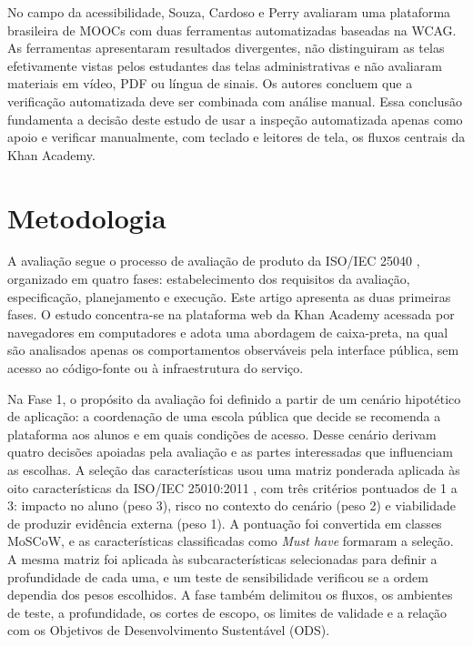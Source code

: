 \documentclass[sigconf, language=english, language=brazilian,natbib=false]{acmart}
\begin{document}
No campo da acessibilidade, Souza, Cardoso e Perry \cite{souza2019limitacoes} avaliaram uma plataforma brasileira de MOOCs com duas ferramentas automatizadas baseadas na WCAG. As ferramentas apresentaram resultados divergentes, não distinguiram as telas efetivamente vistas pelos estudantes das telas administrativas e não avaliaram materiais em vídeo, PDF ou língua de sinais. Os autores concluem que a verificação automatizada deve ser combinada com análise manual. Essa conclusão fundamenta a decisão deste estudo de usar a inspeção automatizada apenas como apoio e verificar manualmente, com teclado e leitores de tela, os fluxos centrais da Khan Academy.

\section{Metodologia}

A avaliação segue o processo de avaliação de produto da ISO/IEC 25040 \cite{iso25040}, organizado em quatro fases: estabelecimento dos requisitos da avaliação, especificação, planejamento e execução. Este artigo apresenta as duas primeiras fases. O estudo concentra-se na plataforma web da Khan Academy acessada por navegadores em computadores e adota uma abordagem de caixa-preta, na qual são analisados apenas os comportamentos observáveis pela interface pública, sem acesso ao código-fonte ou à infraestrutura do serviço.

Na Fase 1, o propósito da avaliação foi definido a partir de um cenário hipotético de aplicação: a coordenação de uma escola pública que decide se recomenda a plataforma aos alunos e em quais condições de acesso. Desse cenário derivam quatro decisões apoiadas pela avaliação e as partes interessadas que influenciam as escolhas. A seleção das características usou uma matriz ponderada aplicada às oito características da ISO/IEC 25010:2011 \cite{iso25010}, com três critérios pontuados de 1 a 3: impacto no aluno (peso 3), risco no contexto do cenário (peso 2) e viabilidade de produzir evidência externa (peso 1). A pontuação foi convertida em classes MoSCoW, e as características classificadas como \textit{Must have} formaram a seleção. A mesma matriz foi aplicada às subcaracterísticas selecionadas para definir a profundidade de cada uma, e um teste de sensibilidade verificou se a ordem dependia dos pesos escolhidos. A fase também delimitou os fluxos, os ambientes de teste, a profundidade, os cortes de escopo, os limites de validade e a relação com os Objetivos de Desenvolvimento Sustentável (ODS).
\end{document}
